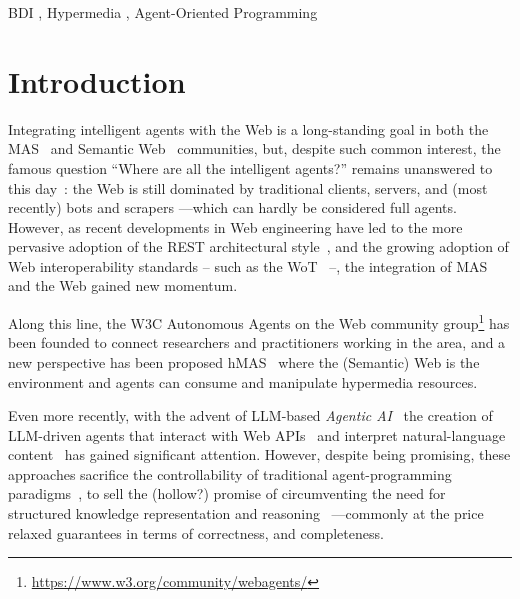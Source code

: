 \documentclass[
]{ceurart}
\begin{document}
\begin{keywords}
  BDI  \sep 
  Hypermedia \sep 
  Agent-Oriented Programming
\end{keywords}

\maketitle

\section{Introduction}

Integrating intelligent agents with the Web is a long-standing goal
in both the \ac{MAS}~\cite{DBLP:conf/edoc/ShafiqDF06}
and Semantic Web~\cite{lassila2001semantic} communities, but,
despite such common interest, 
the famous question 
``Where are all the intelligent agents?''
remains unanswered to this day~\cite{hendlerb2007expert}:
the Web is still dominated by traditional clients, servers, 
and (most recently) bots and scrapers%
---which can hardly be considered full agents.
%
However,
as recent developments in Web engineering have led to 
the more pervasive adoption of the \ac{REST} architectural style~\cite{DBLP:journals/toit/FieldingT02},
and the growing adoption of Web interoperability standards %
-- such as the \ac{WoT}~\cite{wotarch} --,
the integration of \ac{MAS} and the Web gained new momentum.

Along this line, 
the \ac{W3C} Autonomous Agents on the Web community group\footnote{\url{https://www.w3.org/community/webagents/}}
has been founded to connect researchers and practitioners working in the area,
and a new perspective has been proposed \ac{hMAS}~\cite{DBLP:conf/atal/CiorteaMGBRZ19}
where the (Semantic) Web is the environment and
agents can consume and manipulate hypermedia resources.

Even more recently, 
with the advent of \ac{LLM}-based \emph{Agentic AI}~\cite{acharya2025access} 
the creation of \ac{LLM}-driven agents that interact with Web APIs~\missingref{} 
and interpret natural-language content~\missingref{}
has gained significant attention.
%
However,
despite being promising,
these approaches sacrifice the controllability of traditional agent-programming paradigms~\missingref{},
to sell the (hollow?) promise of circumventing the need for structured knowledge representation and reasoning~\cite{pan2024tkde}%
---commonly at the price relaxed guarantees in terms of correctness, and completeness.
\end{document}
